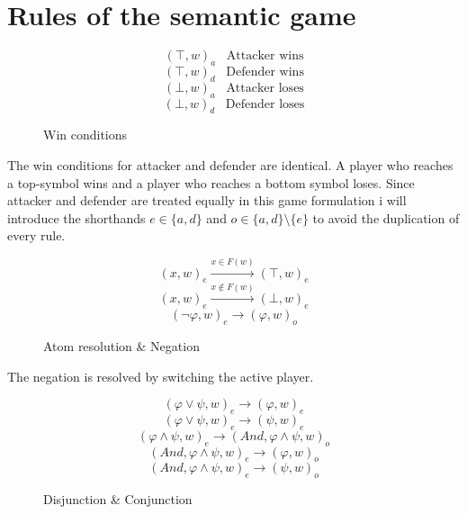 \documentclass[a4paper,american]{paper}
\begin{document}
\section*{Rules of the semantic game}
\begin{figure}[H]
	\centering
	\begin{equation}
		(\top ,w)_{a}\hspace{10pt}\text{Attacker wins}
	\end{equation}
	\begin{equation}
		(\top ,w)_{d}\hspace{10pt}\text{Defender wins}
	\end{equation}
	\begin{equation}
		(\bot ,w)_{a}\hspace{10pt}\text{Attacker loses}
	\end{equation}
	\begin{equation}
		(\bot ,w)_{d}\hspace{10pt}\text{Defender loses}
	\end{equation}
	\caption{Win conditions}
	\label{fig:win_rules}
\end{figure}
	The win conditions for attacker and defender are identical.
	A player who reaches a top-symbol wins and a player who reaches a bottom symbol loses.
	Since attacker and defender are treated equally in this game formulation i will introduce the shorthands $e\in\{ a, d\}$ and $o \in \{ a, d\}\setminus{}\{ e\}$ to avoid the duplication of every rule.
\begin{figure}[H]
	\centering
	\begin{equation}
		(x,w)_{e}\xrightarrow{x\in F(w)}(\top ,w)_{e}
	\end{equation}
	\begin{equation}
		(x,w)_{e}\xrightarrow{x\not\in F(w)}(\bot ,w)_{e}
	\end{equation}
	\begin{equation}
		(\neg\varphi ,w)_{e}\rightarrow (\varphi ,w)_{o}
	\end{equation}
	\caption{Atom resolution \& Negation}
	\label{fig:neg_rules}
\end{figure}
	The negation is resolved by switching the active player.
\begin{figure}[H]
	\centering
	\begin{equation}
		(\varphi\vee\psi ,w)_e\rightarrow (\varphi ,w)_{e}
	\end{equation}
	\begin{equation}
		(\varphi\vee\psi ,w)_e\rightarrow (\psi ,w)_{e}
	\end{equation}
	\begin{equation}
		(\varphi\wedge\psi ,w)_e\rightarrow (And, \varphi\wedge\psi ,w)_{o}
	\end{equation}
	\begin{equation}
		(And, \varphi\wedge\psi ,w)_e\rightarrow (\varphi ,w)_{o}
	\end{equation}
	\begin{equation}
		(And, \varphi\wedge\psi ,w)_e\rightarrow (\psi ,w)_{o}
	\end{equation}
	\caption{Disjunction \& Conjunction}
	\label{fig:neg_rules}
\end{figure}
\end{document}
